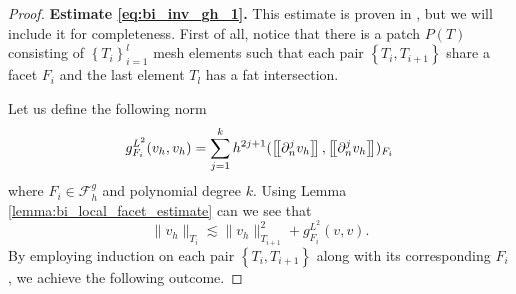 \begin{proof}
        \textbf{Estimate \eqref{eq:bi_inv_gh_1}.}
        This estimate is proven in \cite[Lemma 2.20]{gurkan2019stabilized}, but we will include it for completeness.
            First of all, notice that there is a patch $P(T) $ consisting of $\left\{ T_{i} \right\}_{i=1}^{l} $ mesh elements such that each pair $ \left\{ T_{i}, T_{i+1} \right\} $ share a facet $F_{i}$ and the last element $T_{l}$ has a fat intersection.

            Let us define the following norm
            \begin{equation}
            g_{F_{i}}^{L^{2}}( v_{h},v_{h})  = \sum_{j=1}^{k} h^{2j+1}( \left[\!\left[  \partial ^{j}_{n}v_{h}  \right]\!\right], \left[\!\left[  \partial ^{j}_{n}v_{h}  \right]\!\right]    )_{F_{i} }
            \end{equation}
            where $F_{i} \in  \mathcal{F} ^{g}_{h}$ and polynomial degree $ k$. Using Lemma \ref{lemma:bi_local_facet_estimate} can we see that
            \begin{equation}
            \| v_{h} \|_{ T_{i} }^{  } \lesssim \| v_{h} \|_{ T_{i+1} }^{ 2 } + g_{F_{i}}^{L^{2}}( v,v).
            \end{equation}
By employing induction on each pair $\left\{ T_{i}, T_{i+1} \right\}$ along with its corresponding $F_{i}$, we achieve the following outcome.


\end{proof}
